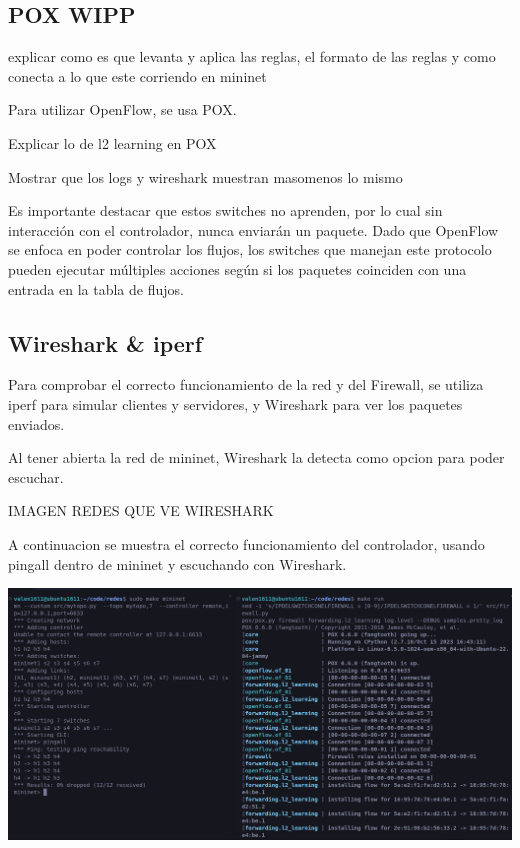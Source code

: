 \documentclass{article}
\begin{document}
\subsection{POX WIPP}\label{pox}
explicar como es que levanta y aplica las reglas, el formato de las reglas
y como conecta a lo que este corriendo en mininet


Para utilizar OpenFlow, se usa POX.

Explicar lo de l2 learning en POX

Mostrar que los logs y wireshark muestran masomenos lo mismo


Es importante destacar que estos switches no aprenden,
por lo cual sin interacción con el controlador, nunca enviarán un paquete.
Dado que OpenFlow se enfoca en poder controlar los flujos, los switches que manejan este protocolo pueden ejecutar
múltiples acciones según si los paquetes coinciden con una entrada en la tabla de flujos. 

\subsection{Wireshark \& iperf}\label{stop-and-wait}

Para comprobar el correcto funcionamiento de la red y del Firewall, se utiliza iperf para
simular clientes y servidores, y Wireshark para ver los paquetes enviados.

Al tener abierta la red de mininet, Wireshark la detecta como opcion para poder escuchar.

IMAGEN REDES QUE VE WIRESHARK
\begin{center}
\end{center}

A continuacion se muestra el correcto funcionamiento del controlador, usando pingall dentro de mininet y escuchando con Wireshark.

\begin{center}
\includegraphics[scale=0.25]{mininet_pingall.png}
\end{center}
\end{document}
